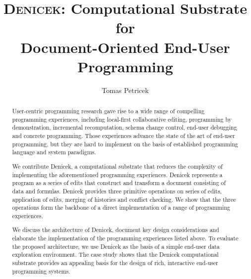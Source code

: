 \documentclass[sigconf,anonymous,screen]{acmart}
\begin{document}
\title[Denicek: Computational Substrate for Document-Oriented End-User
  Programming]{{\scshape Denicek}: Computational Substrate for\\ Document-Oriented End-User Programming}

\author{Tomas Petricek}

\begin{abstract}
User-centric programming research gave rise to a wide range of compelling programming experiences,
including local-first collaborative editing, programming by demonstration, incremental
recomputation, schema change control, end-user debugging and concrete programming.
Those experiences advance the state of the art of end-user programming, but they are hard to
implement on the basis of established programming language and system paradigms.

We contribute Denicek, a computational substrate that reduces the complexity of
implementing the aforementioned programming experiences. Denicek represents a program as a series of edits
that construct and transform a document consisting of data and formulas. Denicek provides three
primitive operations on series of edits, application of edits, merging of histories and conflict checking.
We show that the three operations form the backbone of a direct implementation of a range of
programming experiences.

We discuss the architecture of Denicek, document key design considerations and elaborate
the implementation of the programming experiences listed above. To evaluate the proposed
architecture, we use Denicek as the basis of a simple end-user data exploration environment.
The case study shows that the Denicek computational substrate provides an appealing basis for the
design of rich, interactive end-user programming systems.
\end{abstract}


\maketitle
\end{document}
